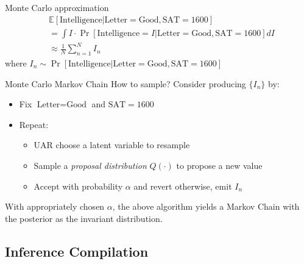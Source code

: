 \begin{frame}[fragile]{Monte Carlo approximation}
\begin{align*}
    &\mathbb{E}[\text{Intelligence} | \text{Letter}=\text{Good}, \text{SAT}=1600] \\
    &= \int I \cdot \Pr[\text{Intelligence}=I | \text{Letter}=\text{Good}, \text{SAT}=1600] dI \\
    &\approx \frac{1}{N} \sum_{n=1}^N I_n
\end{align*}
where $I_n \sim \Pr[\text{Intelligence} | \text{Letter}=\text{Good}, \text{SAT}=1600]$

\end{frame}

\begin{frame}[fragile]{Monte Carlo Markov Chain}
    How to sample? Consider producing $\{I_n\}$ by:
    \begin{itemize}
        \item Fix $\text{Letter}=\text{Good}$ and $\text{SAT}=1600$
        \item Repeat:
        \begin{itemize}
            \item UAR choose a latent variable to resample
            \item Sample a \emph{proposal distribution} $Q(\cdot)$ to propose a new value
            \item Accept with probability $\alpha$ and revert otherwise, emit $I_n$
        \end{itemize}
    \end{itemize}
    \pause
    \begin{theorem}
        With appropriately chosen $\alpha$, the above algorithm yields
        a Markov Chain with the posterior as the invariant distribution.
    \end{theorem}
\end{frame}

\subsection{Inference Compilation}

